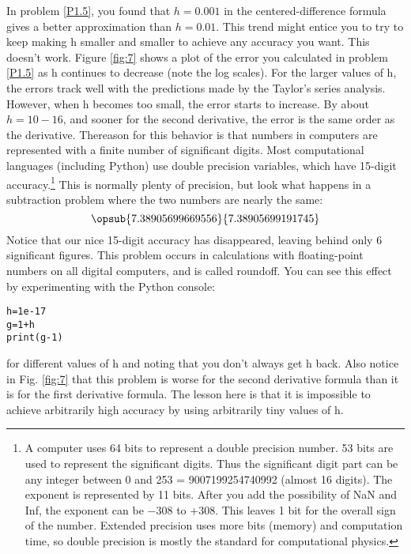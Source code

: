 In problem \ref{P1.5}, you found that $h = 0.001$ in the centered-difference formula gives a better approximation than $h=0.01$. This trend might entice you to try to keep making h smaller and smaller to achieve any accuracy you want. This doesn\rq t work. Figure \ref{fig:7} shows a plot of the error you calculated in problem \ref{P1.5} as h continues to decrease (note the log scales). For the larger values of h, the errors track well with the predictions made by the Taylor\rq s series analysis. However, when h becomes too small, the error starts to increase. By about $h=10−16$, and sooner for the second derivative, the error is the same order as the derivative. Thereason for this behavior is that numbers in computers are represented with a finite number of significant digits. Most computational languages (including Python) use double precision variables, which have 15-digit accuracy.\footnote{A computer uses 64 bits to represent a double precision number. 53 bits are used to represent the significant digits. Thus the significant digit part can be any integer between 0 and 253 = 9007199254740992 (almost 16 digits). The exponent is represented by 11 bits. After you add the possibility of NaN and Inf, the exponent can be −308 to +308. This leaves 1 bit for the overall sign of the number. Extended precision uses more bits (memory) and computation time, so double precision is mostly the standard for computational physics.} This is normally plenty of precision, but look what happens in a subtraction problem where the two numbers are nearly the same:
\begin{equation} \label{eq:12}
\opsub{7.38905699669556}{7.38905699191745}
\end{equation}
Notice that our nice 15-digit accuracy has disappeared, leaving behind only 6 significant figures. This problem occurs in calculations with floating-point numbers on all digital computers, and is called roundoff. You can see this effect by experimenting with the Python console:
\begin{lstlisting}
h=1e-17
g=1+h
print(g-1)
\end{lstlisting}
for different values of h and noting that you don\rq t always get h back. Also notice in Fig. \ref{fig:7} that this problem is worse for the second derivative formula than it is for the first derivative formula. The lesson here is that it is impossible to achieve arbitrarily high accuracy by using arbitrarily tiny values of h.
